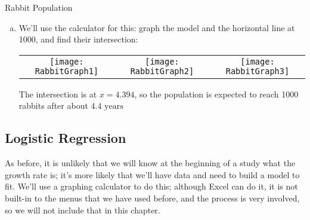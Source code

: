 \begin{example}[https://www.youtube.com/watch?v=mmL2H7_ynUA&list=PLfmpjsIzhztutjEb8Pg5OBOlI1p80yVoy&index=14]{Rabbit Population}
\begin{enumerate}[(a)]
\item We'll use the calculator for this: graph the model and the horizontal line at 1000, and find their intersection:
\begin{center}
\begin{tabular}{c c c}
\texttt{[image: RabbitGraph1]}
& \texttt{[image: RabbitGraph2]}
& \texttt{[image: RabbitGraph3]}
\end{tabular}
\end{center}

The intersection is at $x=4.394$, so the population is expected to reach 1000 rabbits after about $\boxed{4.4 \textrm{ years}}$
\end{enumerate}
\end{example}
\pagebreak

\subsection{Logistic Regression}
As before, it is unlikely that we will know at the beginning of a study what the growth rate is; it's more likely that we'll have data and need to build a model to fit.  We'll use a graphing calculator to do this; although Excel can do it, it is not built-in to the menus that we have used before, and the process is very involved, so we will not include that in this chapter.

